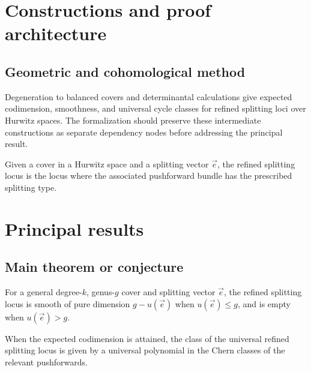 \chapter{Constructions and proof architecture}
\label{chap:refined-brill-noether-theory-hurwitz-spaces-method}

\section{Geometric and cohomological method}
\label{sec:refined-brill-noether-theory-hurwitz-spaces-method}

Degeneration to balanced covers and determinantal calculations give expected codimension, smoothness, and universal cycle classes for refined splitting loci over Hurwitz spaces. The formalization should preserve these intermediate constructions
as separate dependency nodes before addressing the principal result.

\begin{definition}
\label{refined-brill-noether-theory-hurwitz-spaces-central-object}
Given a cover in a Hurwitz space and a splitting vector $\vec e$, the refined splitting locus is the locus where the associated pushforward bundle has the prescribed splitting type.
\notready
\end{definition}

\chapter{Principal results}
\label{chap:refined-brill-noether-theory-hurwitz-spaces-results}

\section{Main theorem or conjecture}
\label{sec:refined-brill-noether-theory-hurwitz-spaces-results}

\begin{theorem}
\label{refined-brill-noether-theory-hurwitz-spaces-main}
For a general degree-$k$, genus-$g$ cover and splitting vector $\vec e$, the refined splitting locus is smooth of pure dimension $g-u(\vec e)$ when $u(\vec e)\leq g$, and is empty when $u(\vec e)>g$.
\notready
\end{theorem}

\begin{proposition}
\label{refined-brill-noether-theory-hurwitz-spaces-secondary}
When the expected codimension is attained, the class of the universal refined splitting locus is given by a universal polynomial in the Chern classes of the relevant pushforwards.
\notready
\end{proposition}
